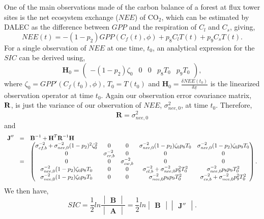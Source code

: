 \documentclass[11pt]{article}
\begin{document}
One of the main observations made of the carbon balance of a forest at flux tower sites is the net ecosystem exchange ($NEE$) of CO$_{2}$, which can be estimated by DALEC as the difference between $GPP$ and the respiration of $C_l$ and $C_s$, giving,
\[ 
NEE(t)=-(1-p_2)GPP(C_f(t),\phi)+p_8C_lT(t)+p_9C_sT(t). 
\]
For a single observation of $NEE$ at one time, $t_0$, an analytical expression for the $SIC$ can be derived using,
\[
\textbf{H}_{0} = \begin{pmatrix}
-(1-p_{2})\zeta_0 & 0 & 0 & p_{8}T_{0} & p_{9}T_{0}
\end{pmatrix},
\]  
where $\zeta_0 = GPP'(C_f(t_0), \phi)$, $T_{0}=T(t_0)$ and $\textbf{H}_{0}=\frac{\delta NEE(t_0)}{\delta\underline{x}}$ is the linearized observation operator at time $t_0$. Again our observation error covariance matrix, $\bf{R}$, is just the variance of our observation of $NEE$, $\sigma_{nee,0}^{2}$, at time $t_0$. Therefore,
\[
\textbf{R}=\sigma_{nee,0}^{2}
\]  
and
\[
\begin{array} {lcl}
\textbf{J}'' &=& \textbf{B}^{-1}+\textbf{H}^{T}\textbf{R}^{-1}\bf{H} \\
&=& \begin{pmatrix} 
\sigma_{cf,b}^{-2}+\sigma_{nee,0}^{-2}(1-p_{2})^{2}\zeta_0^{2} & 0 & 0 & \sigma_{nee,0}^{-2}(1-p_{2})\zeta_0 p_{8}T_0 & \sigma_{nee,0}^{-2}(1-p_{2})\zeta_0 p_{9}T_0 \\
0 & \sigma_{cr,b}^{-2} & 0 & 0 & 0 \\
0 & 0 & \sigma_{cw,b}^{-2} & 0 & 0 \\
\sigma_{nee,0}^{-2}(1-p_{2})\zeta_0 p_{8}T_0 & 0 & 0 & \sigma_{cl,b}^{-2}+\sigma_{nee,0}^{-2}p_{8}^2 T_0^2 & \sigma_{nee,0}^{-2}p_{8}p_{9} T_0^2 \\
\sigma_{nee,0}^{-2}(1-p_{2})\zeta_0 p_{9}T_0 & 0 & 0 & \sigma_{nee,0}^{-2}p_{8}p_{9} T_0^2 & \sigma_{cs,b}^{-2}+\sigma_{nee,0}^{-2}p_{9}^2 T_0^2 \\
\end{pmatrix}.
\end{array}
\] 
We then have,
\[
SIC=\frac{1}{2}ln\frac{\begin{vmatrix} \textbf{B} \end{vmatrix}}{\begin{vmatrix} \textbf{A} \end{vmatrix}} = \frac{1}{2}ln\begin{vmatrix} \textbf{B} \end{vmatrix}\begin{vmatrix} \textbf{J}'' \end{vmatrix}.
\]
\end{document}
